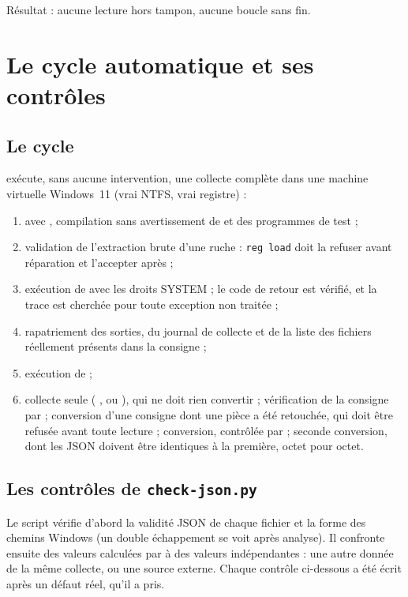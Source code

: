 \documentclass[11pt,a4paper,oneside]{report}
\begin{document}
Résultat : aucune lecture hors tampon, aucune boucle sans fin.

\chapter{Le cycle automatique et ses contrôles}\label{ch:cycle}

\section{Le cycle}

 exécute, sans aucune intervention, une
collecte complète dans une machine virtuelle Windows~11 (vrai NTFS, vrai
registre) :

\begin{enumerate}
  \item avec , compilation sans avertissement de \wac{} et des
    programmes de test ;
  \item validation de l'extraction brute d'une ruche : \texttt{reg load} doit la
    refuser avant réparation et l'accepter après ;
  \item exécution de \wac{} avec les droits SYSTEM ; le code de retour est
    vérifié, et la trace est cherchée pour toute exception non traitée ;
  \item rapatriement des sorties, du journal de collecte et de la liste des
    fichiers réellement présents dans la consigne ;
  \item exécution de  ;
  \item collecte seule (  , ou
    ), qui ne doit rien convertir ; vérification de la consigne
    par  ; conversion d'une consigne dont une pièce
    a été retouchée, qui doit être refusée avant toute lecture ; conversion,
    contrôlée par  ; seconde conversion, dont les JSON
    doivent être identiques à la première, octet pour octet.
\end{enumerate}

\section{Les contrôles de \texttt{check-json.py}}

Le script vérifie d'abord la validité JSON de chaque fichier et la forme des
chemins Windows (un double échappement se voit après analyse). Il confronte
ensuite des valeurs calculées par \wac{} à des valeurs indépendantes : une
autre donnée de la même collecte, ou une source externe. Chaque contrôle
ci-dessous a été écrit après un défaut réel, qu'il a pris.
\end{document}
